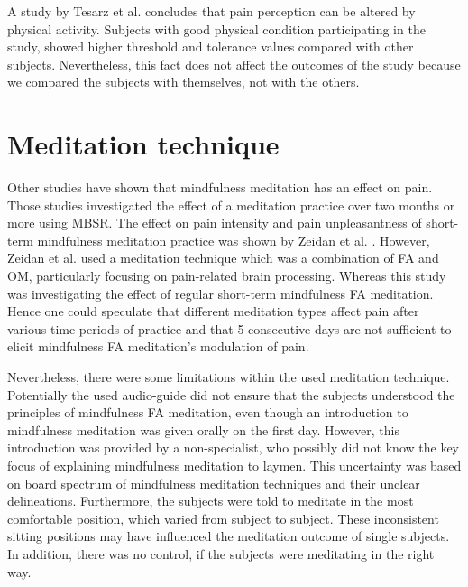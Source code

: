 A study by Tesarz et al. \cite{Tesarz2012} concludes that pain perception can be altered by physical activity. Subjects with good physical condition participating in the study, showed higher threshold and tolerance values compared with other subjects. Nevertheless, this fact does not affect the outcomes of the study because we compared the subjects with themselves, not with the others.

\section{Meditation technique}
Other studies have shown that mindfulness meditation has an effect on pain. Those studies investigated the effect of a meditation practice over two months or more using MBSR. \cite{Kabat1982,Rosenzweig2010} The effect on pain intensity and pain unpleasantness of short-term mindfulness meditation practice was shown by Zeidan et al. \cite{Zeidan2012}. However, Zeidan et al. \cite{Zeidan2012} used a meditation technique which was a combination of FA and OM, particularly focusing on pain-related brain processing. Whereas this study was investigating the effect of regular short-term mindfulness FA meditation. Hence one could speculate that different meditation types affect pain after various time periods of practice and that 5 consecutive days are not sufficient to elicit mindfulness FA meditation’s modulation of pain.

Nevertheless, there were some limitations within the used meditation technique. Potentially the used audio-guide did not ensure that the subjects understood the principles of mindfulness FA meditation, even though an introduction to mindfulness meditation was given orally on the first day. However, this introduction was provided by a non-specialist, who possibly did not know the key focus of explaining mindfulness meditation to laymen. This uncertainty was based on board spectrum of mindfulness meditation techniques and their unclear delineations. 
Furthermore, the subjects were told to meditate in the most comfortable position, which varied from subject to subject. These inconsistent sitting positions may have influenced the meditation outcome of single subjects. In addition, there was no control, if the subjects were meditating in the right way.
